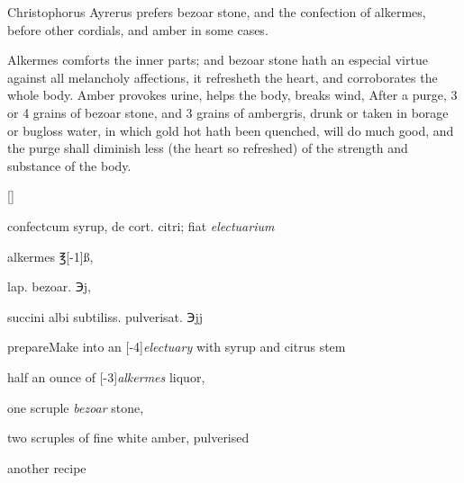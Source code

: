 Christophorus Ayrerus prefers bezoar stone, and the confection of
alkermes, before other cordials, and amber in some cases.

Alkermes comforts the inner parts; and bezoar stone hath an
especial virtue against all melancholy affections, it refresheth
the heart, and corroborates the whole body. Amber provokes urine,
helps the body, breaks wind, \etc{} After a purge, 3 or 4 grains of bezoar
stone, and 3 grains of ambergris, drunk or taken in borage or bugloss
water, in which gold hot hath been quenched, will do much good, and the
purge shall diminish less (the heart so refreshed) of the strength and
substance of the body.

\begin{Prescription}[H]
[\baselineskip]
\begin{prescriptionbox}{\textlatin{confect}}{\textlatin{cum syrup, de cort. citri; fiat \emph{electuarium}}}
\item alkermes ℥[-1\baselineskip]ß,
\item \textlatin{lap. bezoar.} ℈j,
\item \textlatin{succini albi subtiliss. pulverisat. ℈jj}
\end{prescriptionbox}
\begin{prescriptionbox}{prepare}{Make into an [-4\baselineskip]\emph{electuary} with syrup and citrus stem}
\item half an ounce of [-3\baselineskip]\emph{alkermes} liquor,
\item one scruple \emph{bezoar} stone,
\item two scruples of fine white amber, pulverised
\end{prescriptionbox}
\caption{another recipe}
\end{Prescription}

